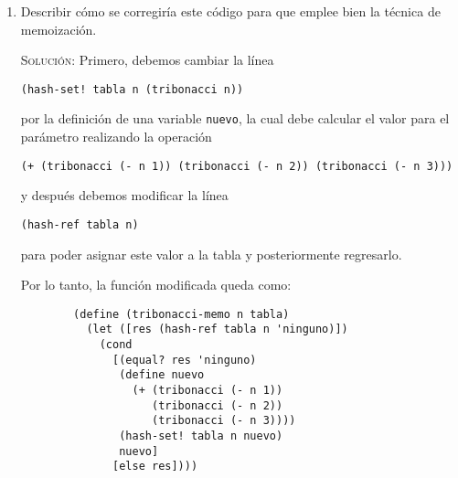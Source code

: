 \documentclass[letterpaper,11pt]{article}
\begin{document}
\begin{enumerate}
\begin{enumerate}
        \item Describir cómo se corregiría este código para que emplee bien la 
        técnica de memoización.
        
        \textsc{Solución:} Primero, debemos cambiar la línea 
        \begin{center}
            \texttt{(hash-set! tabla n (tribonacci n))}    
        \end{center}

        por la definición de una variable \texttt{nuevo}, la cual debe calcular 
        el valor para el parámetro realizando la operación
        \begin{center}
            \texttt{(+ (tribonacci (- n 1)) (tribonacci (- n 2)) 
            (tribonacci (- n 3)))}
        \end{center}
        
        y después debemos modificar la línea
        \begin{center}
            \texttt{(hash-ref tabla n)}
        \end{center}

        para poder asignar este valor a la tabla y posteriormente regresarlo.
        
        Por lo tanto, la función modificada queda como:
        \begin{verbatim}
        (define (tribonacci-memo n tabla)
          (let ([res (hash-ref tabla n 'ninguno)])
            (cond
              [(equal? res 'ninguno)
               (define nuevo
                 (+ (tribonacci (- n 1)) 
                    (tribonacci (- n 2)) 
                    (tribonacci (- n 3))))
               (hash-set! tabla n nuevo)
               nuevo]
              [else res])))
        \end{verbatim}
    \end{enumerate}

\end{enumerate}
\end{document}
